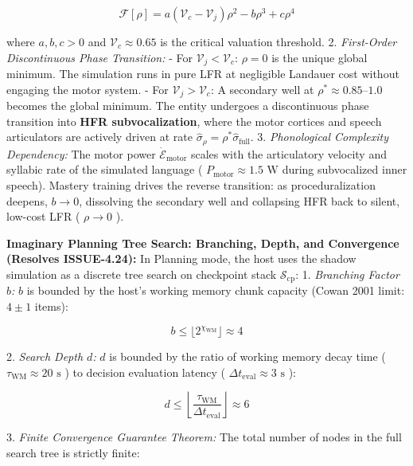 \documentclass[11pt,a4paper]{article}
\theoremstyle{definition}
\theoremstyle{remark}
\begin{document}
\begin{equation}
\mathcal{F}[\rho] = a\left(\mathcal{V}_c - \mathcal{V}_j\right) \rho^2 - b \rho^3 + c \rho^4
\end{equation}


where $a, b, c > 0$ and $\mathcal{V}_c \approx 0.65$ is the critical valuation threshold.
2. \textit{First-Order Discontinuous Phase Transition:}
- For $\mathcal{V}_j < \mathcal{V}_c$: $\rho = 0$ is the unique global minimum. The simulation runs in pure LFR at negligible Landauer cost without engaging the motor system.
- For $\mathcal{V}_j > \mathcal{V}_c$: A secondary well at $\rho^* \approx 0.85\text{--}1.0$ becomes the global minimum. The entity undergoes a discontinuous phase transition into \textbf{HFR subvocalization}, where the motor cortices and speech articulators are actively driven at rate $\hat{\sigma}_\rho = \rho^* \hat{\sigma}_{\text{full}}$.
3. \textit{Phonological Complexity Dependency:} The motor power $\dot{\mathcal{E}}_{\text{motor}}$ scales with the articulatory velocity and syllabic rate of the simulated language ( $P_{\text{motor}} \approx 1.5\text{ W}$ during subvocalized inner speech). Mastery training drives the reverse transition: as proceduralization deepens, $b \to 0$, dissolving the secondary well and collapsing HFR back to silent, low-cost LFR ( $\rho \to 0$ ).

\textbf{Imaginary Planning Tree Search: Branching, Depth, and Convergence (Resolves ISSUE-4.24):}
In Planning mode, the host uses the shadow simulation as a discrete tree search on checkpoint stack $\mathcal{S}_{\text{cp}}$:
1. \textit{Branching Factor $b$:} $b$ is bounded by the host's working memory chunk capacity (Cowan 2001 limit: $4 \pm 1$ items):


\begin{equation}
\boxed{b \le \lfloor 2^{\chi_{\text{WM}}} \rfloor \approx 4}
\end{equation}


2. \textit{Search Depth $d$:} $d$ is bounded by the ratio of working memory decay time ( $\tau_{\text{WM}} \approx 20\text{ s}$ ) to decision evaluation latency ( $\Delta t_{\text{eval}} \approx 3\text{ s}$ ):


\begin{equation}
\boxed{d \le \left\lfloor \frac{\tau_{\text{WM}}}{\Delta t_{\text{eval}}} \right\rfloor \approx 6}
\end{equation}


3. \textit{Finite Convergence Guarantee Theorem:} The total number of nodes in the full search tree is strictly finite:
\end{document}

